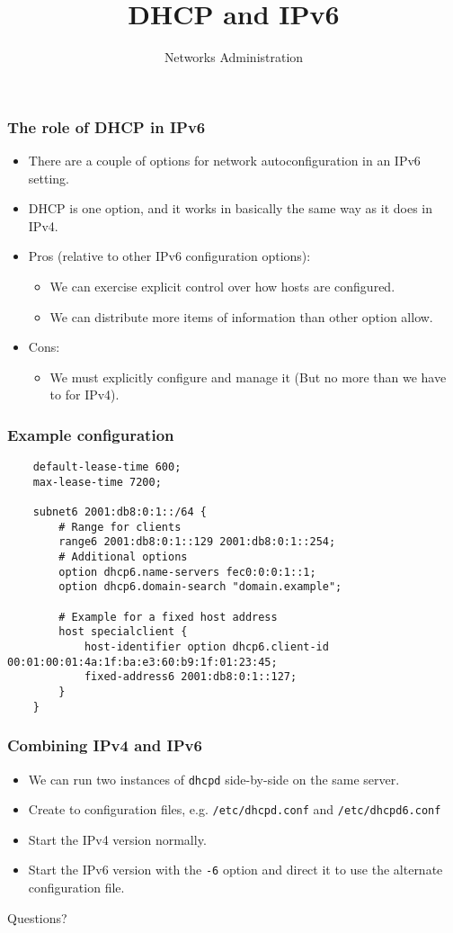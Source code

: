 \documentclass[10pt]{beamer}
\title{DHCP and IPv6}
\author[IN715]{Networks Administration}
\institute[Otago Polytechnic]{
  Otago Polytechnic \\
  Dunedin, New Zealand \\
}
\date{}
\begin{document}
\begin{frame}[plain]
  \titlepage
\end{frame}

\begin{frame}
	\frametitle{The role of DHCP in IPv6}
	\begin{itemize}
	    \item There are a couple of options for network autoconfiguration in an IPv6 setting.
	    \item DHCP is one option, and it works in basically the same way as it does in IPv4.
	    \item Pros (relative to other IPv6 configuration options):
	    \begin{itemize}
	    	\item We can exercise explicit control over how hosts are configured.
	    	\item We can distribute more items of information than other option allow. 
	    \end{itemize}
	    \item Cons:
	    \begin{itemize}
	    	\item We must explicitly configure and manage it (But no more than we have to for IPv4).
	    \end{itemize}
	    \end{itemize}
\end{frame}



\begin{frame}[fragile]
	\frametitle{Example configuration}
	\begin{verbatim}
	default-lease-time 600;
	max-lease-time 7200; 

	subnet6 2001:db8:0:1::/64 {
	    # Range for clients
	    range6 2001:db8:0:1::129 2001:db8:0:1::254;
	    # Additional options
	    option dhcp6.name-servers fec0:0:0:1::1;
	    option dhcp6.domain-search "domain.example";
	
	    # Example for a fixed host address
	    host specialclient {
	        host-identifier option dhcp6.client-id 00:01:00:01:4a:1f:ba:e3:60:b9:1f:01:23:45;
	        fixed-address6 2001:db8:0:1::127;
	    } 
	} 
	\end{verbatim}
\end{frame}

\begin{frame}
	\frametitle{Combining IPv4 and IPv6}
	\begin{itemize}
		\item We can run two instances of \texttt{dhcpd} side-by-side on the same server.
		\item Create to configuration files, e.g. \texttt{/etc/dhcpd.conf} and \texttt{/etc/dhcpd6.conf}
		\item Start the IPv4 version normally.
		\item Start the IPv6 version with the \texttt{-6} option and direct it to use the alternate configuration file.
	\end{itemize}
\end{frame}



\begin{frame}
	Questions?
\end{frame}
\end{document}
